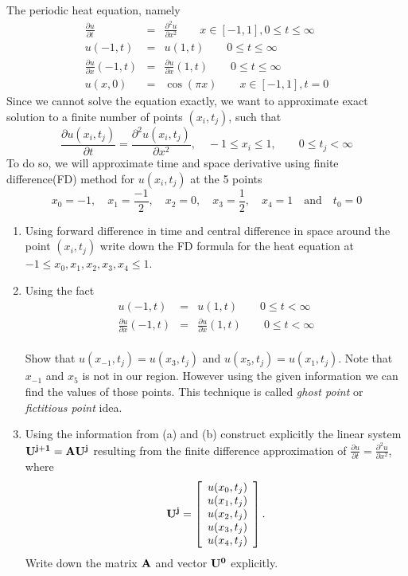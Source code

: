 The periodic heat equation, namely
\begin{eqnarray*}
\frac{\partial u}{\partial t}&=& \frac{\partial^2 u}{\partial x^2 } \qquad x\in[-1,1], 0\leq t \leq \infty\\
										   u(-1,t)&=& u(1,t) \qquad 0\leq t \leq \infty\\
										   \frac{\partial u}{\partial x}(-1,t)&=&\frac{\partial u}{\partial x}(1,t)\qquad 0\leq t \leq \infty\\
										   u(x,0)&=& \cos(\pi x) \qquad x\in[-1,1], t=0
\end{eqnarray*}
Since we cannot solve the equation exactly, we want to approximate exact solution to a finite number of points $(x_i, t_j)$, such that
\[
\frac{\partial u(x_i, t_j)}{\partial t} = \frac{ \partial^2 u(x_i, t_j)}{\partial x^2}, \quad -1 \leq x_i \leq 1, \qquad 0 \leq t_j < \infty
\]
To do so, we will approximate time and space derivative using finite difference(FD) method for $u(x_i, t_j)$ at the 5 points 
\[
x_0 = -1, \quad x_1 = \frac{-1}{2}, \quad x_2 = 0, \quad x_3 = \frac{1}{2}, \quad x_4 = 1 \quad \textrm{and} \quad t_0 =0
\]

\begin{enumerate}
\item Using forward difference in time and central difference in space around the point $(x_i, t_j)$ write down the FD formula for the heat equation at $-1 \leq x_0, x_1, x_2, x_3, x_4 \leq 1$.
\item  Using the fact 
\begin{eqnarray*}
                      u(-1,t)&=& u(1,t) \qquad 0\leq t < \infty\\
										   \frac{\partial u}{\partial x}(-1,t)&=&\frac{\partial u}{\partial x}(1,t)\qquad 0\leq t < \infty\\
										   \end{eqnarray*}

Show that $u(x_{-1}, t_j)=u(x_3, t_j)$ and $u(x_{5}, t_j)=u(x_1, t_j)$. Note that $x_{-1}$ and $x_5$ is not in our region. However using the given information we can find the values of those points. This technique is called \emph{ghost point} or \emph{fictitious point} idea.

\item Using the information from (a) and (b) construct explicitly the linear system ${\bf U^{j+1}}=  {\bf A}{\bf U^j} $ resulting from the finite difference approximation of $\displaystyle{\frac{\partial u}{\partial t} = \frac{\partial^2 u}{\partial x^2 }}$, where
\[
{\bf U^j} = \left[\begin{array}{c}u(x_0, t_j)\\u(x_1, t_j)\\u(x_2, t_j)\\u(x_3, t_j)\\u(x_4, t_j)\end{array}\right].
\]
Write down the matrix $\bf{A}$ and vector $\bf{U^0}$ explicitly.
\end{enumerate}
